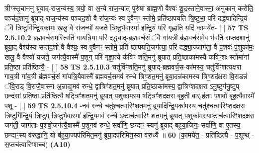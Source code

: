 \documentclass[17pt]{extarticle}
\begin{document}
                  त्रीꣳस्तृ॒चाननु॑ ब्रूयाद्-राज॒न्य॑स्य॒ त्रयो॒ वा अ॒न्ये रा॑ज॒न्या᳚त् पुरु॑षा ब्राह्म॒णो वैश्यः॑ शू॒द्रस्ताने॒वास्मा॒ अनु॑कान् करोति॒ पञ्च॑द॒शानु॑ ब्रूयाद्-राज॒न्य॑स्य पञ्चद॒शो वै रा॑ज॒न्यः॑ स्व ए॒वैनꣳ॒॒ स्तोमे॒ प्रति॑ष्ठापयति त्रि॒ष्टुभा॒ परि॑ दद्ध्यादिन्द्रि॒यं ॅवै त्रि॒ष्टुगि॑न्द्रि॒यका॑मः॒ खलु॒ वै रा॑ज॒न्यो॑ यजते त्रि॒ष्टुभै॒वास्मा॑ इन्द्रि॒यं परि॑ गृह्णाति॒ यदि॑ का॒मये॑त-  [  ] \textbf{  57} \newline
                  \newline
                                \textbf{ TS 2.5.10.2} \newline
                  ब्रह्मवर्च॒सम॒स्त्विति॑ गायत्रि॒या परि॑ दद्ध्याद्-ब्रह्मवर्च॒सं ॅवै गा॑य॒त्री ब्र॑ह्मवर्च॒समे॒व भ॑वति स॒प्तद॒शानु॑ ब्रूया॒द्-वैश्य॑स्य सप्तद॒शो वै वैश्यः॒ स्व ए॒वैनꣳ॒॒ स्तोमे॒ प्रति॑ ष्ठापयति॒जग॑त्या॒ परि॑ दद्ध्या॒ज्जाग॑ता॒ वै प॒शवः॑ प॒शुका॑मः॒ खलु॒ वै वैश्यो॑ यजते॒ जग॑त्यै॒वास्मै॑ प॒शून् परि॑ गृह्णा॒त्ये क॑विꣳ शति॒मनु॑ ब्रूयात् प्रति॒ष्ठाका॑मस्यै कविꣳ॒॒शः स्तोमा॑नां प्रति॒ष्ठा प्रति॑ष्ठित्यै॒ - [  ] \textbf{  58} \newline
                  \newline
                                \textbf{ TS 2.5.10.3} \newline
                  चतु॑र्विꣳशति॒मनु॑ ब्रूयाद्-ब्रह्मवर्च॒स-का॑मस्य॒ चतु॑र्विꣳशत्यक्षरा गाय॒त्री गा॑य॒त्री ब्र॑ह्मवर्च॒सं गा॑यत्रि॒यैवास्मै᳚ ब्रह्मवर्च॒समव॑ रुन्धे त्रिꣳ॒॒शत॒मनु॑ ब्रूया॒दन्न॑कामस्य त्रिꣳ॒॒शद॑क्षरा वि॒राडन्नं॑ ॅवि॒राड् वि॒राजै॒वास्मा॑ अ॒न्नाद्य॒मव॑ रुन्धे॒ द्वात्रिꣳ॑शत॒मनु॑ ब्रूयात् प्रति॒ष्ठाका॑मस्य॒ द्वात्रिꣳ॑शदक्षरा ऽनु॒ष्टुग॑नु॒ष्टुप् छन्द॑सां प्रति॒ष्ठा प्रति॑ष्ठित्यै॒ षट्त्रिꣳ॑शत॒मनु॑ ब्रूयात् प॒शुका॑मस्य॒ षट्त्रिꣳ॑शदक्षरा बृह॒ती बार्.ह॑ताः प॒शवो॑ बृह॒त्यैवास्मै॑ प॒शू - [  ] \textbf{  59} \newline
                  \newline
                                \textbf{ TS 2.5.10.4} \newline
                  -नव॑ रुन्धे॒ चतु॑श्चत्वारिꣳशत॒मनु॑ ब्रूयादिन्द्रि॒यका॑मस्य॒ चतु॑श्चत्वारिꣳशदक्षरा त्रि॒ष्टुगि॑न्द्रि॒यं त्रि॒ष्टुप् त्रि॒ष्टुभै॒वास्मा॑ इन्द्रि॒यमव॑ रुन्धे॒ ऽष्टाच॑त्वारिꣳ शत॒मनु॑ ब्रूयात् प॒शुका॑मस्या॒ष्टाच॑त्वारिꣳशदक्षरा॒ जग॑ती॒ जाग॑ताः प॒शवो॒जग॑त्यै॒वास्मै॑ प॒शूनव॑ रुन्धे॒ सर्वा॑णि॒ छन्दाꣳ॒॒ स्यनु॑ ब्रूयाद्-बहुया॒जिनः॒ सर्वा॑णि॒ वा ए॒तस्य॒ छन्दाꣳ॒॒स्य व॑रुद्धानि॒ यो ब॑हुया॒ज्यप॑रिमित॒मनु॑ ब्रूया॒दप॑रिमित॒स्या व॑रुध्यै ॥ \textbf{  60} \newline
                  \newline
                      (का॒मये॑त॒ - प्रति॑ष्ठित्यै - प॒शून्थ् - स॒प्तच॑त्वारिꣳशच्च)  \textbf{(A10)} \newline \newline
\end{document}
